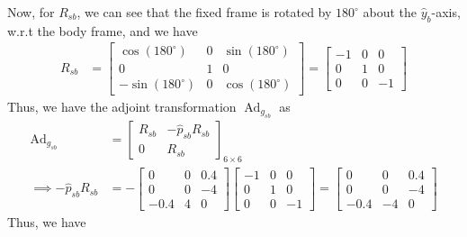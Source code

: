 Now, for \( R_{s b} \), we can see that the fixed frame is rotated by \( 180^{\circ} \) about the \( \hat{y}_{b} \)-axis, w.r.t the body frame, and we have
\begin{align*}
    R_{s b}
     & =
    \begin{bmatrix}
        \cos(180^{\circ})  & 0 & \sin(180^{\circ}) \\
        0                  & 1 & 0                 \\
        -\sin(180^{\circ}) & 0 & \cos(180^{\circ})
    \end{bmatrix}
    =
    \begin{bmatrix}
        -1 & 0 & 0  \\
        0  & 1 & 0  \\
        0  & 0 & -1
    \end{bmatrix}
\end{align*}
Thus, we have the adjoint transformation \( \operatorname{Ad}_{g_{s b}} \) as
\begin{align*}
    \operatorname{Ad}_{g_{s b}}
     & =
    \begin{bmatrix}
        R_{s b} & - \widehat{p}_{s b} R_{s b} \\
        0       & R_{s b}
    \end{bmatrix}_{6 \times 6}
    \\
    \implies
    - \widehat{p}_{s b} R_{s b}
     & =
    - \begin{bmatrix}
          0    & 0 & 0.4 \\
          0    & 0 & -4  \\
          -0.4 & 4 & 0
      \end{bmatrix}
    \begin{bmatrix}
        -1 & 0 & 0  \\
        0  & 1 & 0  \\
        0  & 0 & -1
    \end{bmatrix}
    =
    \begin{bmatrix}
        0    & 0  & 0.4 \\
        0    & 0  & -4  \\
        -0.4 & -4 & 0
    \end{bmatrix}
\end{align*}
Thus, we have
